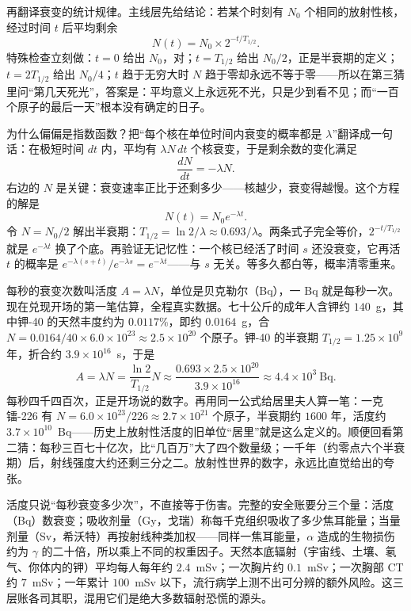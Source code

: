 再翻译衰变的统计规律。主线层先给结论：若某个时刻有 \(N_0\) 个相同的放射性核，经过时间 \(t\) 后平均剩余
\[
N(t)=N_{0}\times2^{-t/T_{1/2}} .
\]
特殊检查立刻做：\(t=0\) 给出 \(N_0\)，对；\(t=T_{1/2}\) 给出 \(N_0/2\)，正是半衰期的定义；\(t=2T_{1/2}\) 给出 \(N_0/4\)；\(t\) 趋于无穷大时 \(N\) 趋于零却永远不等于零——所以在第三猜里问“第几天死光”，答案是：平均意义上永远死不光，只是少到看不见；而“一百个原子的最后一天”根本没有确定的日子。

\begin{mathbridge}
为什么偏偏是指数函数？把“每个核在单位时间内衰变的概率都是 \(\lambda\)”翻译成一句话：在极短时间 \(dt\) 内，平均有 \(\lambda N\,dt\) 个核衰变，于是剩余数的变化满足
\[
\frac{dN}{dt}=-\lambda N .
\]
右边的 \(N\) 是关键：衰变速率正比于还剩多少——核越少，衰变得越慢。这个方程的解是
\[
N(t)=N_{0}e^{-\lambda t}.
\]
令 \(N=N_0/2\) 解出半衰期：\(T_{1/2}=\ln2/\lambda\approx0.693/\lambda\)。两条式子完全等价，\(2^{-t/T_{1/2}}\) 就是 \(e^{-\lambda t}\) 换了个底。再验证无记忆性：一个核已经活了时间 \(s\) 还没衰变，它再活 \(t\) 的概率是 \(e^{-\lambda(s+t)}/e^{-\lambda s}=e^{-\lambda t}\)——与 \(s\) 无关。等多久都白等，概率清零重来。
\end{mathbridge}

每秒的衰变次数叫活度 \(A=\lambda N\)，单位是贝克勒尔（Bq），一 Bq 就是每秒一次。现在兑现开场的第一笔估算，全程真实数据。七十公斤的成年人含钾约 \(140\)~g，其中钾-40 的天然丰度约为 \(0.0117\%\)，即约 \(0.0164\)~g，合 \(N=0.0164/40\times6.0\times10^{23}\approx2.5\times10^{20}\) 个原子。钾-40 的半衰期 \(T_{1/2}=1.25\times10^{9}\) 年，折合约 \(3.9\times10^{16}\)~s，于是
\[
A=\lambda N=\frac{\ln2}{T_{1/2}}N\approx\frac{0.693\times2.5\times10^{20}}{3.9\times10^{16}}\approx4.4\times10^{3}~\mathrm{Bq}.
\]
每秒四千四百次，正是开场说的数字。再用同一公式给居里夫人算一笔：一克镭-226 有 \(N=6.0\times10^{23}/226\approx2.7\times10^{21}\) 个原子，半衰期约 \(1600\) 年，活度约 \(3.7\times10^{10}\)~Bq——历史上放射性活度的旧单位“居里”就是这么定义的。顺便回看第二猜：每秒三百七十亿次，比“几百万”大了四个数量级；一千年（约零点六个半衰期）后，射线强度大约还剩三分之二。放射性世界的数字，永远比直觉给出的夸张。

活度只说“每秒衰变多少次”，不直接等于伤害。完整的安全账要分三个量：活度（Bq）数衰变；吸收剂量（Gy，戈瑞）称每千克组织吸收了多少焦耳能量；当量剂量（Sv，希沃特）再按射线种类加权——同样一焦耳能量，\(\alpha\) 造成的生物损伤约为 \(\gamma\) 的二十倍，所以乘上不同的权重因子。天然本底辐射（宇宙线、土壤、氡气、你体内的钾）平均每人每年约 \(2.4\)~mSv；一次胸片约 \(0.1\)~mSv；一次胸部 CT 约 \(7\)~mSv；一年累计 \(100\)~mSv 以下，流行病学上测不出可分辨的额外风险。这三层账各司其职，混用它们是绝大多数辐射恐慌的源头。

